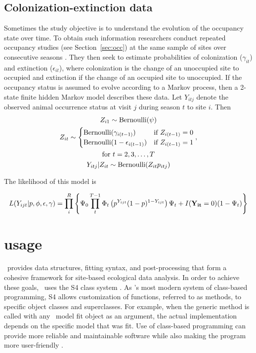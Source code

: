 \documentclass[article,shortnames]{jss}
\DeclareMathOperator{\Bern}{Bernoulli}
\newcommand{\um}{\pkg{unmarked}}
\newcommand{\rlang}{\proglang{R}}
\begin{document}
\subsection{Colonization-extinction data}

Sometimes the study objective is to understand the evolution of
the occupancy state over time.  To obtain such information researchers conduct 
repeated occupancy studies (see Section~\ref{sec:occ}) at the same sample of 
sites over consecutive seasons \citep{MacKenzie2003}.  They then seek to estimate
probabilities of colonization ($\gamma_{it}$) and extinction
($\epsilon_{it}$), where colonization is the change of an unoccupied
site to occupied and extinction if the change of an occupied site to
unoccupied.  If the occupancy status is assumed to evolve according to
a Markov process, then a 2-state finite hidden Markov model describes
these data.  Let $Y_{itj}$ denote the observed animal occurrence
status at visit $j$ during season $t$ to site $i$.  Then
\begin{gather}
  Z_{i1} \sim \Bern(\psi) \\
  Z_{it} \sim
  \begin{cases}
    \Bern(\gamma_{i(t-1)}) & \text{if $Z_{i(t-1)} = 0$} \\
    \Bern(1-\epsilon_{i(t-1)}) & \text{if $Z_{i(t-1)} = 1$}
  \end{cases}, \\
  \text{for $t=2,3,\dots,T$} \notag \\
  Y_{itj} | Z_{it} \sim \Bern(Z_{it} p_{itj})
\end{gather}


The likelihood of this model is

\begin{equation}
L(Y_{ijt}| p,\phi,\epsilon,\gamma) = 
 \prod_{i}^{R} \left\{
    \Psi_0 \prod_{t}^{T-1} 
      \Phi_t \left(p^{Y_{ijt}}(1-p)^{1-Y_{ijt}}\right)
          \Psi_t + I({\bf Y_{it}}=0)(1-\Psi_t) \right\} 
\end{equation}
 


\section[unmarked usage]{ usage}
\label{sec:unmarked-usage}

\um\ provides
data structures, fitting syntax, and post-processing that form a
cohesive framework for site-based ecological data analysis.  In order
to achieve these goals, \um\ uses the S4 class system
\citep{Chambers2008}. As \rlang's most modern system of class-based
programming, S4 allows customization of functions, referred to as
methods, to specific object classes and superclasses. For example,
when the generic  method is called with any \um\ model
fit object as an argument, the actual  implementation
depends on the specific model that was fit.  Use of class-based
programming can provide more reliable and maintainable software while
also making the program more user-friendly \citep{Chambers2008}.
\end{document}
